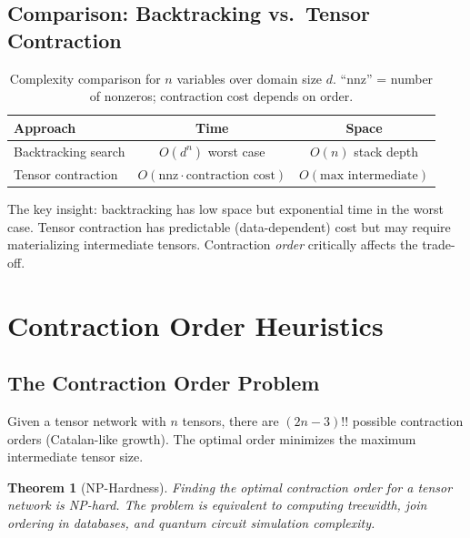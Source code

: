 \documentclass[11pt,a4paper]{article}
\newtheorem{theorem}{Theorem}
\begin{document}
\subsection{Comparison: Backtracking vs.\ Tensor Contraction}

\begin{table}[ht]
\centering
\begin{tabular}{lcc}
\toprule
\textbf{Approach} & \textbf{Time} & \textbf{Space} \\
\midrule
Backtracking search & $O(d^n)$ worst case & $O(n)$ stack depth \\
Tensor contraction & $O(\text{nnz} \cdot \text{contraction cost})$ & $O(\text{max intermediate})$ \\
\bottomrule
\end{tabular}
\caption{Complexity comparison for $n$ variables over domain size $d$.
  ``nnz'' = number of nonzeros; contraction cost depends on order.}
\label{tab:complexity_chirho}
\end{table}

The key insight: backtracking has low space but exponential time in the worst case.
Tensor contraction has predictable (data-dependent) cost but may require materializing
intermediate tensors. Contraction \emph{order} critically affects the trade-off.

\section{Contraction Order Heuristics}
\label{sec:heuristics_chirho}

\subsection{The Contraction Order Problem}

Given a tensor network with $n$ tensors, there are $(2n-3)!!$ possible contraction orders
(Catalan-like growth). The optimal order minimizes the maximum intermediate tensor size.

\begin{theorem}[NP-Hardness]
Finding the optimal contraction order for a tensor network is NP-hard.
The problem is equivalent to computing treewidth, join ordering in databases,
and quantum circuit simulation complexity.
\end{theorem}
\end{document}
